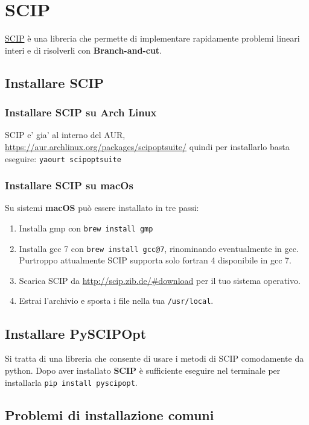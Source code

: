\documentclass[\main/main.tex]{subfiles}
\begin{document}
\chapter{SCIP}
\href{http://scip.zib.de/#scipoptsuite}{SCIP} è una libreria che permette di implementare rapidamente problemi lineari interi e di risolverli con \textbf{Branch-and-cut}.

\section{Installare SCIP}

\subsection{Installare SCIP su Arch Linux}
SCIP e' gia' al interno del AUR, \url{https://aur.archlinux.org/packages/scipoptsuite/} quindi per installarlo basta eseguire:
\texttt{yaourt scipoptsuite}

\subsection{Installare SCIP su macOs}
Su sistemi \textbf{macOS} può essere installato in tre passi:

\begin{enumerate}
    \item Installa gmp con \texttt{brew install gmp}
    \item Installa gcc 7 con \texttt{brew install gcc@7}, rinominando eventualmente in gcc. Purtroppo attualmente SCIP supporta solo fortran 4 disponibile in gcc 7.
    \item Scarica SCIP da \url{http://scip.zib.de/#download} per il tuo sistema operativo.
    \item Estrai l'archivio e sposta i file nella tua \texttt{/usr/local}.
\end{enumerate}

\section{Installare PySCIPOpt}
Si tratta di una libreria che consente di usare i metodi di SCIP comodamente da python. Dopo aver installato \textbf{SCIP} è sufficiente eseguire nel terminale per installarla \texttt{pip install pyscipopt}.

\section{Problemi di installazione comuni}
\end{document}
